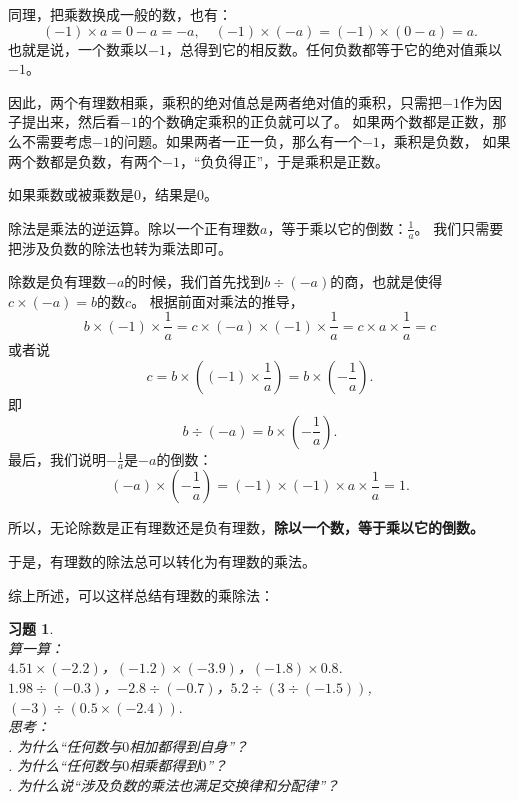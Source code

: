 \documentclass[12pt,UTF8]{ctexbook}
\newtheorem{xt}{习题}[section]
\begin{document}
同理，把乘数换成一般的数，也有：
$$(-1) \times a =  0 - a = -a, \quad (-1) \times (-a) = (-1) \times (0 - a) = a.$$
也就是说，一个数乘以$-1$，总得到它的相反数。任何负数都等于它的绝对值乘以$-1$。

因此，两个有理数相乘，乘积的绝对值总是两者绝对值的乘积，只需把$-1$作为因子提出来，然后看$-1$的个数确定乘积的正负就可以了。
如果两个数都是正数，那么不需要考虑$-1$的问题。如果两者一正一负，那么有一个$-1$，乘积是负数，
如果两个数都是负数，有两个$-1$，“负负得正”，于是乘积是正数。

如果乘数或被乘数是$0$，结果是$0$。

除法是乘法的逆运算。除以一个正有理数$a$，等于乘以它的倒数：$\frac{1}{a}$。
我们只需要把涉及负数的除法也转为乘法即可。

除数是负有理数$-a$的时候，我们首先找到$b \div (-a)$的商，也就是使得$c \times (-a) = b$的数$c$。
根据前面对乘法的推导，
$$ b \times (-1) \times \frac{1}{a} = c \times (-a) \times (-1) \times \frac{1}{a} = c \times a \times \frac{1}{a} = c$$
或者说
$$c = b\times \left((-1) \times \frac{1}{a}\right) = b\times \left(-\frac{1}{a}\right) .$$
即
$$b \div (-a) = b\times \left(-\frac{1}{a}\right). $$
最后，我们说明$-\frac{1}{a}$是$-a$的倒数：
$$ (-a) \times \left(-\frac{1}{a}\right) = (-1)\times (-1) \times a \times \frac{1}{a} = 1.$$

所以，无论除数是正有理数还是负有理数，\textbf{除以一个数，等于乘以它的倒数。}

于是，有理数的除法总可以转化为有理数的乘法。

综上所述，可以这样总结有理数的乘除法：
\begin{center}
\end{center}

\begin{xt}\label{xt:3-0-1}
    \mbox{}\\
    \indent 算一算：\\
    \indent $4.51 \times (-2.2)$，$(-1.2) \times (-3.9)$，$(-1.8)\times 0.8.$ \\
    \indent $1.98 \div (-0.3)$，$-2.8 \div (-0.7)$，$5.2 \div (3 \div (-1.5))$, $(-3) \div (0.5 \times (-2.4)).$ \\
    \indent 思考：\\
    . 为什么“任何数与$0$相加都得到自身”？\\
    . 为什么“任何数与$0$相乘都得到$0$”？\\
    . 为什么说“涉及负数的乘法也满足交换律和分配律”？
\end{xt}
\end{document}
